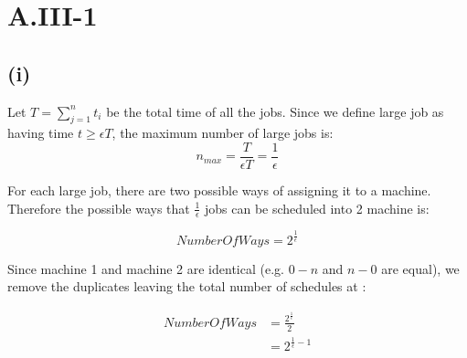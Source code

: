 \section*{A.III-1}
\subsection*{(i)}
\label{approx-3-1-i}

Let $ T = \sum_{j=1}^{n} t_i $ be the total time of all the jobs.
Since we define large job as having time  $ t \ge \epsilon T $, the maximum number of large jobs is:
$$ n_{max} = \frac{T}{\epsilon T} = \frac{1}{\epsilon} $$

For each large job, there are two possible ways of assigning it to a machine.
Therefore the possible ways that $\frac{1}{\epsilon}$ jobs can be scheduled into 2 machine is:

$$ Number Of Ways = 2^{\frac{1}{\epsilon}} $$

Since machine 1 and machine 2 are identical (e.g. $0-n$ and $n-0$ are equal), we remove the duplicates leaving the 
total number of schedules at :

\begin{align*}
	Number Of Ways &= \frac{2^\frac{1}{\epsilon}}{2} \\
	&= 2^{\frac{1}{\epsilon}-1}
\end{align*}

